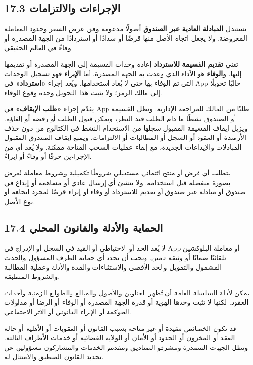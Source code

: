 \documentclass[11pt]{article}
\begin{document}
\subsection*{17.3 الإجراءات والالتزامات}

تستبدل \textbf{المبادلة العادية عبر الصندوق} أصولًا مدعومة وفق عرض السعر وحدود المعاملة المعروضة. ولا يجعل اتجاه الأصل منها قرضًا أو سدادًا أو استردادًا من الجهة المصدرة أو وفاءً في العالم الحقيقي.

تعني \textbf{تقديم القسيمة للاسترداد} إعادة وحدات القسيمة إلى الجهة المصدرة أو تقديمها إليها. و\textbf{الوفاء} هو الأداء الذي وعدت به الجهة المصدرة. أما \textbf{الإبراء} فهو تسجيل الوحدات التي تم الوفاء بها حتى لا يُعاد استخدامها. ويُعد إجراء \textbf{«استرداد»} في App حاليًا تحويلًا إلى مالك الرمز؛ ولا يثبت هذا التحويل وحده وقوع الوفاء.

يقدّم إجراء \textbf{«طلب الإيقاف»} في App طلبًا من المالك للمراجعة الإدارية. وتظل القسيمة أو الصندوق نشطًا ما دام الطلب قيد النظر، ويمكن قبول الطلب أو رفضه أو إلغاؤه. ويزيل إيقاف القسيمة المقبول سجلها من الاستخدام النشط في الكتالوج من دون حذف الأرصدة أو العقود أو السجل أو المطالبات أو الالتزامات. ويمنع إيقاف الصندوق المقبول المبادلات والإيداعات الجديدة، مع إبقاء عمليات السحب المتاحة ممكنة. ولا يُعد أي من الإجراءين حرقًا أو وفاءً أو إبراءً.

يتطلب أي قرض أو منتج ائتماني مستقبلي شروطًا تكميلية وشروط معاملة تُعرض بصورة منفصلة قبل استخدامه. ولا ينشئ أي إرسال عادي أو مساهمة أو إيداع في صندوق أو مبادلة عبر صندوق أو تقديم للاسترداد أو وفاء أو إبراء قرضًا لمجرد اتجاهه أو نوع الأصل.

\subsection*{17.4 الحماية والأدلة والقانون المحلي}

لا يُعد الحد أو الاحتياطي أو القيد في السجل أو الإدراج في App أو معاملة البلوكشين تلقائيًا ضمانًا أو وثيقة تأمين. ويجب أن تحدد أي حماية الطرف المسؤول والحدث المشمول والتمويل والحد الأقصى والاستثناءات والمدة والأدلة وعملية المطالبة والشروط المنطبقة.

يمكن لأدلة السلسلة العامة أن تُظهر العناوين والأصول والمبالغ والطوابع الزمنية وأحداث العقود. لكنها لا تثبت وحدها الهوية أو قدرة الجهة المصدرة أو الوفاء أو الرضا أو مداولات الحوكمة أو الإبراء القانوني أو الأثر الاجتماعي.

قد تكون الخصائص مقيدة أو غير متاحة بسبب القانون أو العقوبات أو الأهلية أو حالة العقد أو المخزون أو الحدود أو الأمان أو الولاية القضائية أو خدمات الأطراف الثالثة. وتظل الجهات المصدرة ومشرفو الصناديق ومقدمو الخدمات والمشاركون مسؤولين عن تحديد القانون المنطبق والامتثال له.
\end{document}
